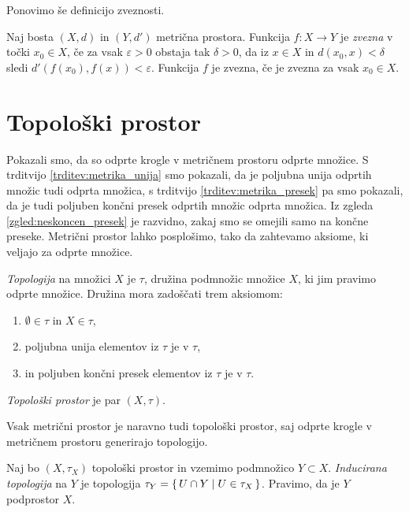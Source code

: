 \documentclass{isrmdelo}
\begin{document}
\medskip

Ponovimo še definicijo zveznosti.

\begin{definicija}
Naj bosta $(X,d)$ in $(Y,d')$ metrična prostora. Funkcija $f: X \rightarrow Y$ je \emph{zvezna} v točki $x_0 \in X$, če za vsak $\varepsilon > 0$ obstaja tak $\delta > 0$, da iz $x \in X$ in $d(x_0, x) < \delta$ sledi $d'(f(x_0), f(x)) < \varepsilon$. Funkcija $f$ je zvezna, če je zvezna za vsak $x_0 \in X$.
\end{definicija}

\section{Topološki prostor}

Pokazali smo, da so odprte krogle v metričnem prostoru odprte množice. S trditvijo \ref{trditev:metrika_unija} smo pokazali, da je poljubna unija odprtih množic tudi odprta množica, s trditvijo \ref{trditev:metrika_presek} pa smo pokazali, da je tudi poljuben končni presek odprtih množic odprta množica. Iz zgleda \ref{zgled:neskoncen_presek} je razvidno, zakaj smo se omejili samo na končne preseke. Metrični prostor lahko posplošimo, tako da zahtevamo aksiome, ki veljajo za odprte množice.

\begin{definicija}
\emph{Topologija} na množici $X$ je $\tau$, družina podmnožic množice $X$, ki jim pravimo odprte množice. Družina mora zadoščati trem aksiomom:
\begin{enumerate}
\item $\emptyset \in \tau$ in $X \in \tau$,
\item poljubna unija elementov iz $\tau$ je v $\tau$,
\item in poljuben končni presek elementov iz $\tau$ je v $\tau$.
\end{enumerate}
\emph{Topološki prostor} je par $(X, \tau)$.
\end{definicija}

Vsak metrični prostor je naravno tudi topološki prostor, saj odprte krogle v metričnem prostoru generirajo topologijo.

\begin{definicija}
Naj bo $(X, \tau_X)$ topološki prostor in vzemimo podmnožico $Y \subset X$. \emph{Inducirana topologija} na $Y$ je topologija $\tau_Y = \set{ U \cap Y \mid U \in \tau_X }$. Pravimo, da je $Y$ podprostor $X$.
\end{definicija}
\end{document}
